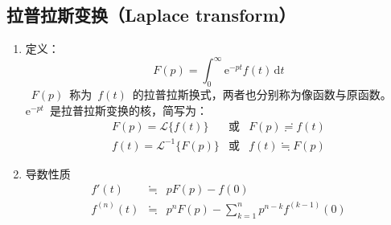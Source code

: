 \documentclass[12pt,a4paper]{article}
\newcommand\diff{\,\mathrm{d}}
\renewcommand{\[}{\ $\displaystyle}
\renewcommand{\]}{$\ }%
\newcommand\e{\mathrm{e}}
\begin{document}
	\subsection{拉普拉斯变换（Laplace transform）}
	 \begin{enumerate}
	 \newcommand{\re}{\mathrm{Re}~}
	   \item 定义：
	   	$$
	   	  F(p) = \int_0^\infty\e^{-pt}f(t)\diff t
	   	$$
	   	\[F(p)\]称为\[f(t)\]的拉普拉斯换式，两者也分别称为像函数与原函数。\[\e^{-pt}\]是拉普拉斯变换的核，简写为：
	   	\begin{eqnarray*}
	   	 F(p) = \mathscr{L}\{f(t)\} &\mbox{或}& F(p)\risingdotseq f(t) \\
	   	 f(t) = \mathscr{L}^{-1}\{F(p)\} &\mbox{或}& f(t)\fallingdotseq F(p)
	   	\end{eqnarray*}
	   \item 导数性质
	   	\begin{eqnarray*}
	   		f'(t)&\fallingdotseq & pF(p) - f(0)\\
	   		f^{(n)}(t) &\fallingdotseq & p^n F(p) - \sum_{k=1}^{n}p^{n-k}f^{(k-1)}(0)
	   	\end{eqnarray*}

\end{enumerate}
\end{document}
